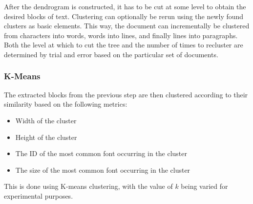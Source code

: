 After the dendrogram is constructed, it has to be cut at some level to obtain
the desired blocks of text. Clustering can optionally be rerun using the newly
found clusters as basic elements. This way, the document can incrementally be
clustered from characters into words, words into lines, and finally lines into
paragraphs. Both the level at which to cut the tree and the number of times to
recluster are determined by trial and error based on the particular set of
documents.

\subsubsection{K-Means}
The extracted blocks from the previous step are then clustered according to
their similarity based on the following metrics:
\begin{itemize}
  \item Width of the cluster
  \item Height of the cluster
  \item The ID of the most common font occurring in the cluster
  \item The size of the most common font occurring in the cluster
\end{itemize}
This is done using K-means clustering, with the value of $k$ being varied for
experimental purposes.


